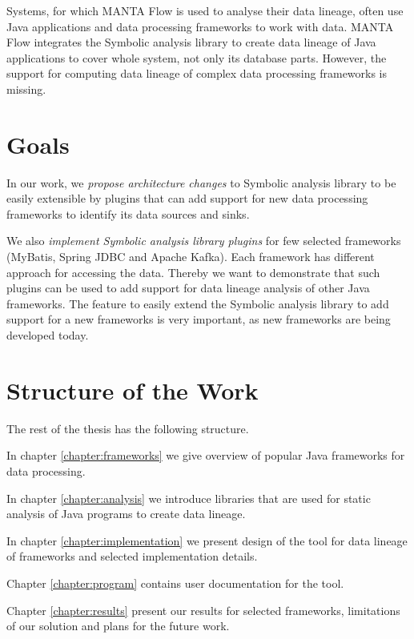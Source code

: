 Systems, for which MANTA Flow is used to analyse their data lineage,
often use Java applications and data processing frameworks to work with data.
MANTA Flow integrates the Symbolic analysis library to create data lineage of
Java applications to cover whole system, not only its database parts.
However, the support for computing data lineage of complex data processing frameworks
is missing.




\section{Goals}

In our work, we \textit{propose architecture changes} to Symbolic analysis library
to be easily extensible by plugins that can add support for new data processing frameworks
to identify its data sources and sinks.

We also \textit{implement Symbolic analysis library plugins} for few selected frameworks
(MyBatis, Spring JDBC and Apache Kafka).
Each framework has different approach for accessing the data.
Thereby we want to demonstrate that such plugins can be used to
add support for data lineage analysis of other Java frameworks.
The feature to easily extend the Symbolic analysis library to add support for a new frameworks
is very important, as new frameworks are being developed today.




\section{Structure of the Work}

The rest of the thesis has the following structure.

In chapter \ref{chapter:frameworks} we give overview of popular Java frameworks
for data processing.

In chapter \ref{chapter:analysis} we introduce libraries that are used
for static analysis of Java programs to create data lineage.

In chapter \ref{chapter:implementation} we present design of the \ToolName tool for
data lineage of frameworks and selected implementation details.

Chapter \ref{chapter:program} contains user documentation for the \ToolName tool.

Chapter \ref{chapter:results} present our results for selected frameworks,
limitations of our solution and plans for the future work.

